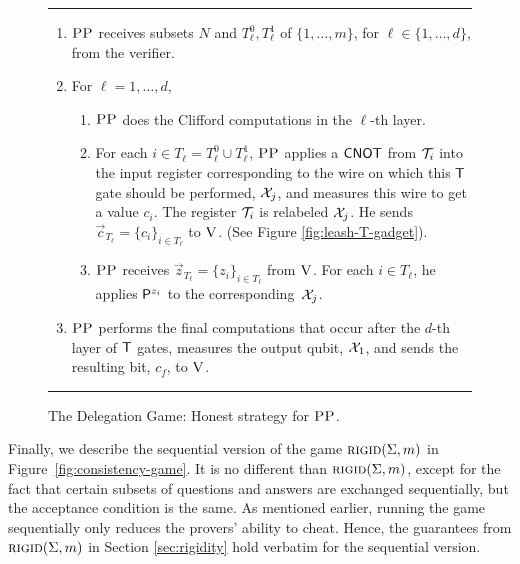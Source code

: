 \documentclass[11pt,letter]{article}
\theoremstyle{remark}
\theoremstyle{definition}
\newcommand{\rigid}{\textsc{rigid}}
\newcommand{\ver}{\textsc{V}}
\newcommand{\pp}{\textsc{PP}}
\begin{document}
\begin{figure}[H]
\rule[1ex]{16.5cm}{0.5pt}
\begin{enumerate}
\item $\pp$ receives subsets $N$ and $T_\ell^0,T_\ell^1$ of $\{1,\ldots,m\}$, for $\ell\in\{1,\ldots,d\}$, from the verifier. 
\item For $\ell=1,\dots,d$, 
\begin{enumerate}
\item $\pp$ does the Clifford computations in the $\ell$-th layer.
 \item For each $i\in T_\ell = T_\ell^0\cup T_\ell^1$, $\pp$ applies a $\sf CNOT$ from ${\cal T}_i$ into the input register corresponding to the wire on which this $\sf T$ gate should be performed, ${\cal X}_{j}$, and measures this wire to get a value $c_i$. The register ${\cal T}_i$ is relabeled ${\cal X}_{j}$. He sends $\vec{c}_{T_\ell} = \{c_i\}_{i\in T_{\ell}}$ to $\ver$. (See Figure \ref{fig:leash-T-gadget}).
\item $\pp$ receives $\vec{z}_{T_{\ell}}=\{z_i\}_{i\in T_\ell}$ from $\ver$. For each $i\in T_\ell$, he applies ${\sf P}^{z_i}$ to the corresponding~${\cal X}_{j}$. 
\end{enumerate} 
\item $\pp$ performs the final computations that occur after the $d$-th layer of $\sf T$ gates, measures the output qubit, ${\cal X}_1$, and sends the resulting bit, $c_f$, to $\ver$. 
\end{enumerate}
\rule[2ex]{16.5cm}{0.5pt}\vspace{-.5cm}
\caption{The Delegation Game: Honest strategy for $\pp$.}\label{fig:leash-protocol-PP}
\end{figure}

Finally, we describe the sequential version of the game $\rigid(\Sigma,m)$ in Figure~\ref{fig:consistency-game}. It is no different than $\rigid(\Sigma,m)$, except for the fact that certain subsets of questions and answers are exchanged sequentially, but the acceptance condition is the same. As mentioned earlier, running the game sequentially only reduces the provers' ability to cheat. Hence, the guarantees from $\rigid(\Sigma,m)$ in Section \ref{sec:rigidity} hold verbatim for the sequential version. 
\end{document}
